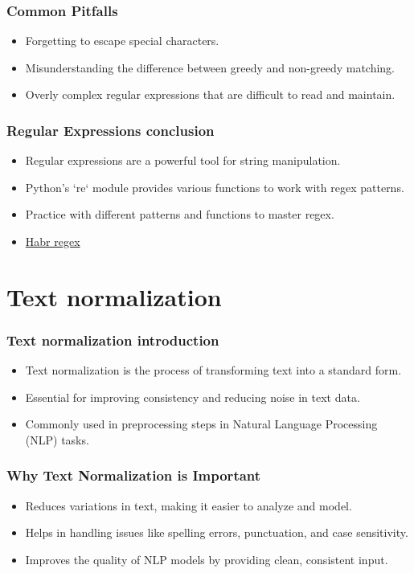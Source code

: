 \documentclass{beamer}
\begin{document}
\begin{frame}
    \frametitle{Common Pitfalls}
    \begin{itemize}
        \item Forgetting to escape special characters.
        \item Misunderstanding the difference between greedy and non-greedy matching.
        \item Overly complex regular expressions that are difficult to read and maintain.
    \end{itemize}
\end{frame}

\begin{frame}
    \frametitle{Regular Expressions conclusion}
    \begin{itemize}
        \item Regular expressions are a powerful tool for string manipulation.
        \item Python’s `re` module provides various functions to work with regex patterns.
        \item Practice with different patterns and functions to master regex.
        \item \href{https://habr.com/ru/articles/349860/}{Habr regex}
    \end{itemize}
\end{frame}


\section{Text normalization}

\begin{frame}
    \frametitle{Text normalization introduction}
    \begin{itemize}
        \item Text normalization is the process of transforming text into a standard form.
        \item Essential for improving consistency and reducing noise in text data.
        \item Commonly used in preprocessing steps in Natural Language Processing (NLP) tasks.
    \end{itemize}
\end{frame}

\begin{frame}
    \frametitle{Why Text Normalization is Important}
    \begin{itemize}
        \item Reduces variations in text, making it easier to analyze and model.
        \item Helps in handling issues like spelling errors, punctuation, and case sensitivity.
        \item Improves the quality of NLP models by providing clean, consistent input.
    \end{itemize}
\end{frame}
\end{document}
